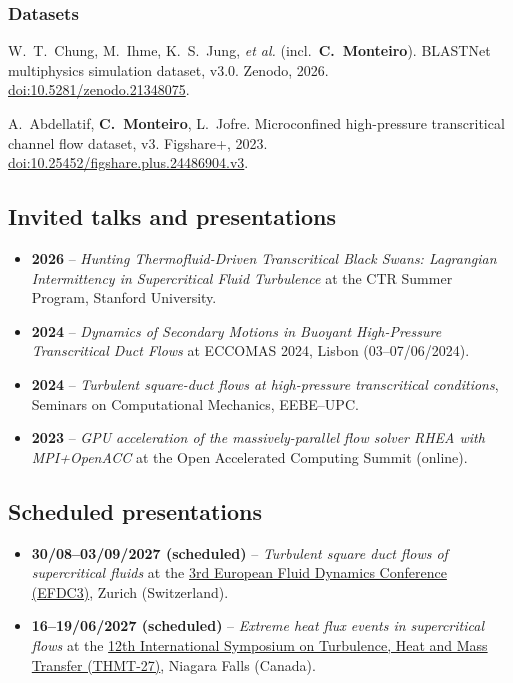 \documentclass[11pt]{article}
\begin{document}
\subsubsection*{Datasets}
\begin{enumerate}[label={[D\arabic*]}, itemsep=0pt]
  \item \hypertarget{pub-D1}{}W.\ T.\ Chung, M.\ Ihme, K.\ S.\ Jung, \emph{et al.} (incl.\ \textbf{C.\ Monteiro}).
  BLASTNet multiphysics simulation dataset, v3.0. Zenodo, 2026.
  \href{https://doi.org/10.5281/zenodo.21348075}{doi:10.5281/zenodo.21348075}.
  \item \hypertarget{pub-D2}{}A.\ Abdellatif, \textbf{C.\ Monteiro}, L.\ Jofre. Microconfined high-pressure
  transcritical channel flow dataset, v3. Figshare+, 2023.
  \href{https://doi.org/10.25452/figshare.plus.24486904.v3}{doi:10.25452/figshare.plus.24486904.v3}.
\end{enumerate}

\subsection{Invited talks and presentations}
\begin{itemize}
  \item \textbf{2026} -- \emph{Hunting Thermofluid-Driven
  Transcritical Black Swans: Lagrangian Intermittency in Supercritical Fluid Turbulence}
  at the CTR Summer Program, Stanford University. 
  \item \textbf{2024} -- \emph{Dynamics of Secondary Motions in Buoyant High-Pressure Transcritical Duct Flows} at ECCOMAS 2024, Lisbon (03--07/06/2024).
  \item \textbf{2024} -- \emph{Turbulent square-duct flows at high-pressure transcritical conditions}, Seminars on Computational Mechanics, EEBE--UPC.\nocert
  \item \textbf{2023} -- \emph{GPU acceleration
  	of the massively-parallel flow solver RHEA with MPI+OpenACC} at the Open Accelerated Computing Summit (online).\nocert
\end{itemize}

\subsection{Scheduled presentations}\label{sec:scheduled_talks}
\begin{itemize}
	\item \textbf{30/08--03/09/2027 (scheduled)} -- \emph{Turbulent square duct flows of supercritical fluids}  at the
	\href{https://efdc3.com/}{3rd European Fluid Dynamics Conference (EFDC3)}, Zurich
	(Switzerland).
	\item \textbf{16--19/06/2027 (scheduled)} -- \emph{Extreme heat flux events in supercritical flows} at the \href{https://thmt-27.org/}{12th International Symposium on Turbulence, Heat and Mass
		Transfer (THMT-27)}, Niagara Falls (Canada).
\end{itemize}
\end{document}
